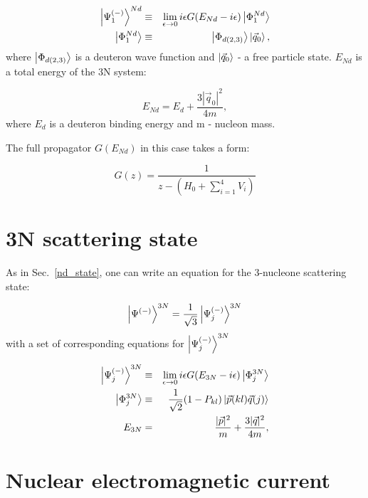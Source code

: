     \begin{eqnarray}
        \ket{\Psi^{(-)}_1}^{Nd} &\equiv& \lim_{\epsilon \rightarrow 0} 
        i \epsilon G(E_{Nd} - i\epsilon)\ket{\Phi^{Nd}_1}\\
        \ket{\Phi^{Nd}_1} &\equiv& \ket{\Phi_{d(2,3)}}\ket{\vec{q}_0},
    \end{eqnarray}
    where $\ket{\Phi_{d(2,3)}}$ is a deuteron wave function and 
    $\ket{\vec{q}_0}$ - a free particle state. $E_{Nd}$
    is a total energy of the 3N system:

    \begin{equation}
        E_{Nd} = E_d + \frac{3 |\vec{q}_0|^2}{4m},
    \end{equation}
    where $E_d$ is a deuteron binding energy and m - nucleon mass. 

    The full propagator $G(E_{Nd})$ in this case takes a form:
    
    \begin{equation}
        G(z)= \frac{1}{z - (H_0 + \sum_{i=1}^4V_i)}
    \end{equation}


\section{3N scattering state}

    As in Sec.~\ref{nd_state}, one can
    write an equation for the 3-nucleone scattering state:

    \begin{equation}
        \ket{\Psi^{(-)}}^{3N} = \frac{1}{\sqrt{3}}\ket{\Psi^{(-)}_j}^{3N}    
    \end{equation}
    with a set of corresponding equations for $\ket{\Psi^{(-)}_j}^{3N}$

    \begin{eqnarray}
        \ket{\Psi^{(-)}_j}^{3N}  &\equiv& \lim_{\epsilon \rightarrow 0}
        i \epsilon G(E_{3N} - i\epsilon)\ket{\Phi^{3N}_j}\\
        \ket{\Phi^{3N}_j} &\equiv& \frac{1}{\sqrt{2}}(1 - P_{kl})
        \ket{\vec{p}(kl)\vec{q}(j)}\\
        E_{3N} &=& \frac{|\vec{p}|^2}{m} + \frac{3 |\vec{q}|^2}{4m},
    \end{eqnarray}


    \section{Nuclear electromagnetic current}

